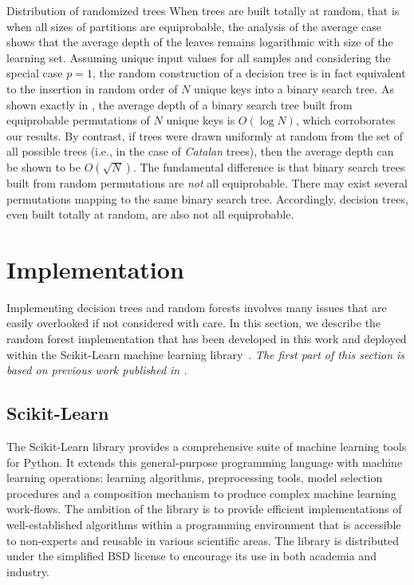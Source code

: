\begin{remark}{Distribution of randomized trees}
When trees are built totally at random, that is when all sizes of partitions
are equiprobable, the analysis of the average case shows that the average depth
of the leaves remains logarithmic with size of the learning set. Assuming
unique input values for all samples and considering the special case $p=1$,
the random construction of a decision tree
is in fact equivalent to the insertion in random order of $N$ unique keys into
a binary search tree. As shown exactly in \citep{sedgewick:2013}, the average
depth of a binary search tree built from equiprobable permutations of $N$
unique keys is $O(\log N)$, which corroborates our results. By contrast, if
trees were drawn uniformly at random from the set of all possible  trees (i.e.,
in the case of \textit{Catalan} trees), then the average depth can be shown to
be $O(\sqrt{N})$. The fundamental difference is that binary search trees built
from random permutations are \textit{not} all equiprobable. There may exist
several permutations mapping to the same binary search tree. Accordingly,
decision trees, even built totally at random, are also not all equiprobable.
\end{remark}


\section{Implementation}
\label{sec:5:impl}

Implementing decision trees and random forests involves many issues that are
easily overlooked if not considered with care. In this section, we describe the
random forest implementation that has been developed in this work and
deployed within the Scikit-Learn machine learning
library~\citep{pedregosa:2011}. \textit{The first part of this section is based
on previous work published in \citep{buitinck:2013}.}

\subsection{Scikit-Learn}

The Scikit-Learn library provides a comprehensive suite of machine learning
tools for Python. It extends this general-purpose programming language with
machine learning operations: learning algorithms, preprocessing tools, model
selection procedures and a composition mechanism to produce complex machine
learning work-flows. The ambition of the library is to provide efficient
implementations of well-established algorithms within a programming environment
that is accessible to non-experts and reusable in various scientific areas. The
library is distributed under the simplified BSD license to encourage its use in
both academia and industry.

